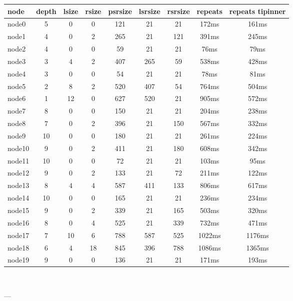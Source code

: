 

\begin{tabular}{|l|c|c|c|c|c|c|c|c|}
\hline node & depth & lsize & rsize & psrsize & lsrsize & rsrsize   & repeats & repeats tipinner\\
    \hline node0 & 5 & 0 & 0 & 121 & 21 & 21 & 172ms & 161ms\\
    \hline node1 & 4 & 0 & 2 & 265 & 21 & 121 & 391ms & 245ms\\
    \hline node2 & 4 & 0 & 0 & 59 & 21 & 21 & 76ms & 79ms\\
    \hline node3 & 3 & 4 & 2 & 407 & 265 & 59 & 538ms & 428ms\\
    \hline node4 & 3 & 0 & 0 & 54 & 21 & 21 & 78ms & 81ms\\
    \hline node5 & 2 & 8 & 2 & 520 & 407 & 54 & 764ms & 504ms\\
    \hline node6 & 1 & 12 & 0 & 627 & 520 & 21 & 905ms & 572ms\\
    \hline node7 & 8 & 0 & 0 & 150 & 21 & 21 & 204ms & 238ms\\
    \hline node8 & 7 & 0 & 2 & 396 & 21 & 150 & 567ms & 332ms\\
    \hline node9 & 10 & 0 & 0 & 180 & 21 & 21 & 261ms & 224ms\\
    \hline node10 & 9 & 0 & 2 & 411 & 21 & 180 & 608ms & 342ms\\
    \hline node11 & 10 & 0 & 0 & 72 & 21 & 21 & 103ms & 95ms\\
    \hline node12 & 9 & 0 & 2 & 133 & 21 & 72 & 211ms & 122ms\\
    \hline node13 & 8 & 4 & 4 & 587 & 411 & 133 & 806ms & 617ms\\
    \hline node14 & 10 & 0 & 0 & 165 & 21 & 21 & 236ms & 234ms\\
    \hline node15 & 9 & 0 & 2 & 339 & 21 & 165 & 503ms & 320ms\\
    \hline node16 & 8 & 0 & 4 & 525 & 21 & 339 & 732ms & 471ms\\
    \hline node17 & 7 & 10 & 6 & 788 & 587 & 525 & 1022ms & 1176ms\\
    \hline node18 & 6 & 4 & 18 & 845 & 396 & 788 & 1086ms & 1365ms\\
    \hline node19 & 9 & 0 & 0 & 136 & 21 & 21 & 171ms & 193ms\\

\hline
\end{tabular} \

---


